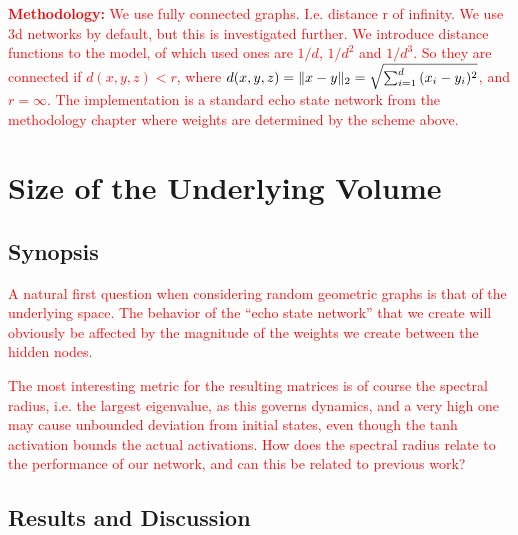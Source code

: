 \textcolor{red}{
  \textbf{Methodology:} We use fully connected graphs. I.e. distance r of
infinity. We use 3d networks by default, but this is investigated further. We
introduce distance functions to the model, of which used ones are $1/d$, $1/d^2$
and $1/d^3$. So they are connected if $d(x, y, z) < r$, where $d(x, y, z) =
\Vert x-y \Vert_{2} = \sqrt{\sum_{i=1}^{d}{(x_{i}-y_{i})^2}}$, and $r = \infty$. The
implementation is a standard echo state network from the methodology chapter
where weights are determined by the scheme above.
}

\section{Size of the Underlying Volume}

\subsection{Synopsis}

\textcolor{red}{
  A natural first question when considering random geometric graphs is that of
the underlying space. The behavior of the ``echo state network'' that we create
will obviously be affected by the magnitude of the weights we create between the
hidden nodes.
}

\textcolor{red}{
  The most interesting metric for the resulting matrices is of course the
spectral radius, i.e. the largest eigenvalue, as this governs dynamics, and a
very high one may cause unbounded deviation from initial states, even though the
tanh activation bounds the actual activations. How does the spectral radius
relate to the performance of our network, and can this be related to previous
work?
}

\subsection{Results and Discussion}

